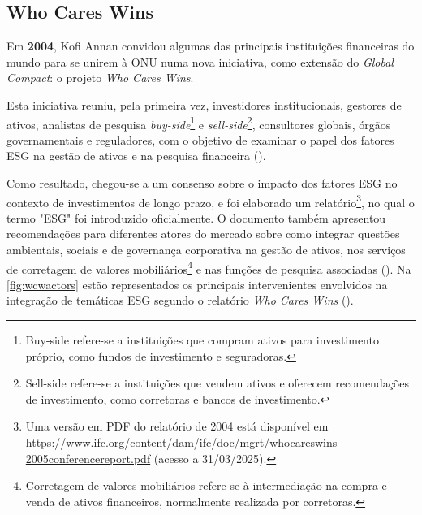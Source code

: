 \subsection{Who Cares Wins}
\label{subsec: WCW}

Em \textbf{2004}, Kofi Annan convidou algumas das principais instituições financeiras do mundo para se unirem à \gls{ONU} numa nova iniciativa, como extensão do \textit{Global Compact}: o projeto \textit{Who Cares Wins}.

Esta iniciativa reuniu, pela primeira vez, investidores institucionais, gestores de ativos, analistas de pesquisa \textit{buy-side}\footnote{Buy-side refere-se a instituições que compram ativos para investimento próprio, como fundos de investimento e seguradoras.} e \textit{sell-side}\footnote{Sell-side refere-se a instituições que vendem ativos e oferecem recomendações de investimento, como corretoras e bancos de investimento.}, consultores globais, órgãos governamentais e reguladores, com o objetivo de examinar o papel dos fatores \gls{ESG} na gestão de ativos e na pesquisa financeira (\cite{Pollman2024}).

Como resultado, chegou-se a um consenso sobre o impacto dos fatores ESG no contexto de investimentos de longo prazo, e foi elaborado um relatório\footnote{Uma versão em PDF do relatório de 2004 está disponível em \url{https://www.ifc.org/content/dam/ifc/doc/mgrt/whocareswins-2005conferencereport.pdf} (acesso a 31/03/2025).}, no qual o termo "ESG" foi introduzido oficialmente. O documento também apresentou recomendações para diferentes atores do mercado sobre como integrar questões ambientais, sociais e de governança corporativa na gestão de ativos, nos serviços de corretagem de valores mobiliários\footnote{Corretagem de valores mobiliários refere-se à intermediação na compra e venda de ativos financeiros, normalmente realizada por corretoras.} e nas funções de pesquisa associadas (\cite{onValues2005}). Na \autoref{fig:wcwactors} estão representados os principais intervenientes envolvidos na integração de temáticas \gls{ESG} segundo o relatório \textit{Who Cares Wins} (\cite{onValues2005}).

